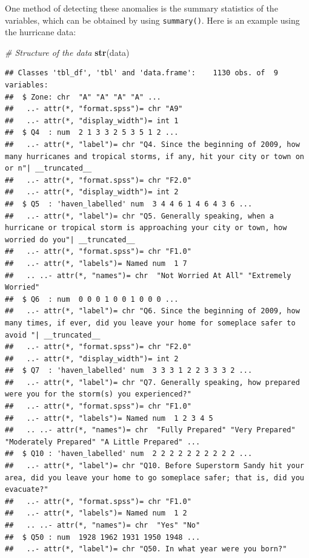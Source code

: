 \documentclass[
]{book}
\newenvironment{Shaded}{\begin{snugshade}}{\end{snugshade}}
\newcommand{\CommentTok}[1]{\textcolor[rgb]{0.56,0.35,0.01}{\textit{#1}}}
\newcommand{\KeywordTok}[1]{\textcolor[rgb]{0.13,0.29,0.53}{\textbf{#1}}}
\newcommand{\NormalTok}[1]{#1}
\begin{document}
One method of detecting these anomalies is the summary statistics of the variables, which can be obtained by using \texttt{summary()}. Here is an example using the hurricane data:

\begin{Shaded}
\begin{Highlighting}[]
\CommentTok{\# Structure of the data}
\KeywordTok{str}\NormalTok{(data)}
\end{Highlighting}
\end{Shaded}

\begin{verbatim}
## Classes 'tbl_df', 'tbl' and 'data.frame':    1130 obs. of  9 variables:
##  $ Zone: chr  "A" "A" "A" "A" ...
##   ..- attr(*, "format.spss")= chr "A9"
##   ..- attr(*, "display_width")= int 1
##  $ Q4  : num  2 1 3 3 2 5 3 5 1 2 ...
##   ..- attr(*, "label")= chr "Q4. Since the beginning of 2009, how many hurricanes and tropical storms, if any, hit your city or town on or n"| __truncated__
##   ..- attr(*, "format.spss")= chr "F2.0"
##   ..- attr(*, "display_width")= int 2
##  $ Q5  : 'haven_labelled' num  3 4 4 6 1 4 6 4 3 6 ...
##   ..- attr(*, "label")= chr "Q5. Generally speaking, when a hurricane or tropical storm is approaching your city or town, how worried do you"| __truncated__
##   ..- attr(*, "format.spss")= chr "F1.0"
##   ..- attr(*, "labels")= Named num  1 7
##   .. ..- attr(*, "names")= chr  "Not Worried At All" "Extremely Worried"
##  $ Q6  : num  0 0 0 1 0 0 1 0 0 0 ...
##   ..- attr(*, "label")= chr "Q6. Since the beginning of 2009, how many times, if ever, did you leave your home for someplace safer to avoid "| __truncated__
##   ..- attr(*, "format.spss")= chr "F2.0"
##   ..- attr(*, "display_width")= int 2
##  $ Q7  : 'haven_labelled' num  3 3 3 1 2 2 3 3 3 2 ...
##   ..- attr(*, "label")= chr "Q7. Generally speaking, how prepared were you for the storm(s) you experienced?"
##   ..- attr(*, "format.spss")= chr "F1.0"
##   ..- attr(*, "labels")= Named num  1 2 3 4 5
##   .. ..- attr(*, "names")= chr  "Fully Prepared" "Very Prepared" "Moderately Prepared" "A Little Prepared" ...
##  $ Q10 : 'haven_labelled' num  2 2 2 2 2 2 2 2 2 2 ...
##   ..- attr(*, "label")= chr "Q10. Before Superstorm Sandy hit your area, did you leave your home to go someplace safer; that is, did you evacuate?"
##   ..- attr(*, "format.spss")= chr "F1.0"
##   ..- attr(*, "labels")= Named num  1 2
##   .. ..- attr(*, "names")= chr  "Yes" "No"
##  $ Q50 : num  1928 1962 1931 1950 1948 ...
##   ..- attr(*, "label")= chr "Q50. In what year were you born?"

\end{verbatim}
\end{document}

